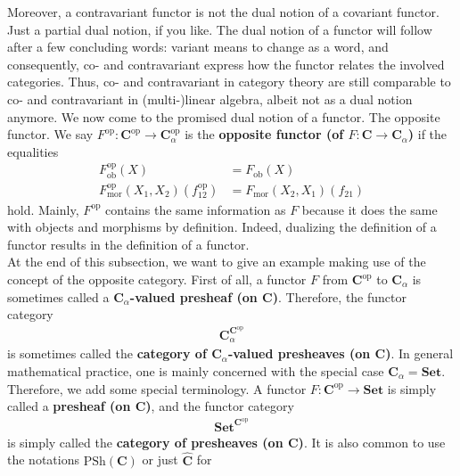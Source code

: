 Moreover, a contravariant functor is not the dual notion of a covariant functor.
Just a partial dual notion, if you like.
The dual notion of a functor will follow after a few concluding words: {\glqq}variant{\grqq} means {\glqq}to change{\grqq} as a word, and consequently, co- and contravariant express how the functor relates the involved categories.
Thus, co- and contravariant in category theory are still comparable to co- and contravariant in (multi-)linear algebra, albeit not as a dual notion anymore.
We now come to the promised dual notion of a functor.
The opposite functor.
We say $F^{\mathrm{op}} \colon \mathbf{C}^{\mathrm{op}} \rightarrow \mathbf{C}_{\alpha}^{\mathrm{op}}$ is the \textbf{opposite functor (of $F \colon \mathbf{C} \rightarrow \mathbf{C}_{\alpha}$)} if the equalities
\begin{align*}
  F_{\mathrm{ob}}^{\mathrm{op}}(X)
  &=
  F_{\mathrm{ob}}(X)
  \\
  F_{\mathrm{mor}}^{\mathrm{op}}(X_{1},X_{2})(f_{12}^{\mathrm{op}})
  &=
  F_{\mathrm{mor}}(X_{2},X_{1})(f_{21})
\end{align*}
hold.
Mainly, $F^{\mathrm{op}}$ contains the same information as $F$ because it does the same with objects and morphisms by definition.
Indeed, dualizing the definition of a functor results in the definition of a functor.
\\
At the end of this subsection, we want to give an example making use of the concept of the opposite category.
First of all, a functor $F$ from $\mathbf{C}^{\mathrm{op}}$ to $\mathbf{C}_{\alpha}$ is sometimes called a \textbf{$\mathbf{C}_{\alpha}$-valued presheaf (on $\mathbf{C}$)}.
Therefore, the functor category
\begin{align*}
  \mathbf{C}_{\alpha}^{\mathbf{C}^{\mathrm{op}}}
\end{align*}
is sometimes called the \textbf{category of $\mathbf{C}_{\alpha}$-valued presheaves (on $\mathbf{C}$)}.
In general mathematical practice, one is mainly concerned with the special case $\mathbf{C}_{\alpha} = \mathbf{Set}$.
Therefore, we add some special terminology.
A functor $F \colon \mathbf{C}^{\mathrm{op}} \rightarrow \mathbf{Set}$ is simply called a \textbf{presheaf (on $\mathbf{C}$)}, and the functor category
\begin{align*}
  \mathbf{Set}^{\mathbf{C}^{\mathrm{op}}}
\end{align*}
is simply called the \textbf{category of presheaves (on $\mathbf{C}$)}.
It is also common to use the notations $\mathrm{PSh}(\mathbf{C})$ or just $\widehat{\mathbf{C}}$ for
